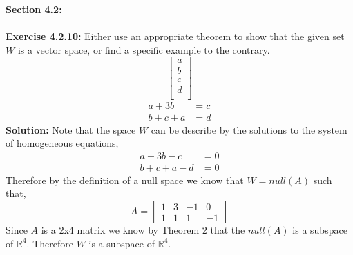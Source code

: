 \documentclass{amsart}
\def\RR{{\mathbb R}}
\begin{document}
\thispagestyle{fancy}





{\huge\textbf{Section 4.2:}}\\\\
\noindent\textbf{Exercise 4.2.10: }  Either use an appropriate theorem to show that the given set  $W$ is a vector space, or find a specific example to the contrary. 
\begin{equation*}
\begin{bmatrix}
a\\
b\\
c\\
d\\
\end{bmatrix}
\end{equation*}
\begin{align*}
a+3b&=c\\
b+c+a&=d
\end{align*}
\noindent \textbf{Solution: } Note that the space $W$ can be describe by the solutions to the system of homogeneous equations,
\begin{align*}
a+3b-c&=0\\
b+c+a-d&=0
\end{align*}
Therefore by the definition of a null space we know that $W = null(A)$ such that,
\begin{equation*}
A=
\begin{bmatrix}
1& 3&-1&0\\
1&1&1&-1
\end{bmatrix}
\end{equation*}
Since $A$ is a 2x4 matrix we know by Theorem 2 that the $null(A)$ is a subspace of $\RR^4$. Therefore $W$  is a subspace of $\RR^4$.
\vspace{1in}
\end{document}
